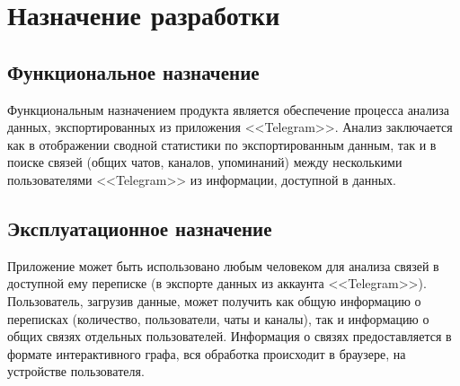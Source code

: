 \section{Назначение разработки}

\subsection{Функциональное назначение}

Функциональным назначением продукта является обеспечение процесса анализа данных, экспортированных из приложения <<Telegram>>.
Анализ заключается как в отображении сводной статистики по экспортированным данным, так и в поиске связей (общих чатов, каналов, упоминаний) между несколькими пользователями <<Telegram>> из информации, доступной в данных.

\subsection{Эксплуатационное назначение}

Приложение может быть использовано любым человеком для анализа связей в доступной ему переписке (в экспорте данных из аккаунта <<Telegram>>).
Пользователь, загрузив данные, может получить как общую информацию о переписках (количество, пользователи, чаты и каналы), так и информацию о общих связях отдельных пользователей.
Информация о связях предоставляется в формате интерактивного графа, вся обработка происходит в браузере, на устройстве пользователя.